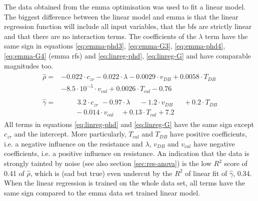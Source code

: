 The data obtained from the \gls{emma} optimisation was used to fit a linear model. 
The biggest difference between the linear model and \gls{emma} is that the linear regression function will include all input variables, that the \gls{bf}s are strictly linear and that there are no interaction terms. 
The coefficients of the $\lambda$ term have the same sign in equations \ref{eq:emma-phd3}, \ref{eq:emma-G3}, \ref{eq:emma-phd4}, \ref{eq:emma-G4} (\gls{emma} \gls{rf}s) and \ref{eq:linreg-phd}, \ref{eq:linreg-G} and have comparable magnitudes too. 
%
%
\begin{align}
	\begin{split}
		\label{eq:linreg-phd}
		\hat{\rho} =&  -0.022\cdot c_{zr} -0.022\cdot \lambda -0.0029\cdot v_{DB} + 0.0058\cdot T_{DB} \\
		& -8.5\cdot 10^{-5}\cdot v_{cal} + 0.0026\cdot T_{cal} -0.76
	\end{split}
	\\
	\begin{split}
		\label{eq:linreg-G}
		\hat{\gamma} =&  \,\,\qquad 3.2\cdot c_{zr} \,\, - 0.97\cdot \lambda \,\,\quad - 1.2\cdot v_{DB}  \,\,\,\quad +0.2\cdot T_{DB} \\
			& \qquad - 0.014\cdot v_{cal} \quad + 0.13\cdot T_{cal} + 7.2
	\end{split}
\end{align}
%
All terms in equations \ref{eq:linreg-phd} and \ref{eq:linreg-G} have the same sign 
except $c_{zr}$ and the intercept. 
%
More particularly, $T_{cal}$ and $T_{DB}$ have positive coefficients, i.e. a negative influence on the resistance 
and $\lambda$, $v_{DB}$ and $v_{cal}$ have negative coefficients, i.e. a positive influence on resistance. 
An indication that the data is strongly tainted by noise (see also section \ref{sec:res-anova}) is the low $R^2$ score of 0.41 of $\hat\rho$, 
which is (sad but true) even undercut by the $R^2$ of linear fit of $\hat\gamma$, 0.34. 
When the linear regression is trained on the whole data set, all terms have the same sign compared to the \gls{emma} data set trained linear model. 
